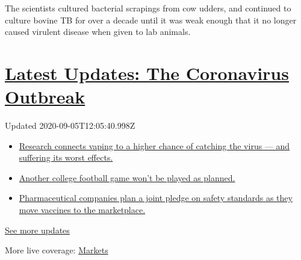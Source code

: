 The scientists cultured bacterial scrapings from cow udders, and
continued to culture bovine TB for over a decade until it was weak
enough that it no longer caused virulent disease when given to lab
animals.

\hypertarget{latest-updates-the-coronavirus-outbreak}{%
\section{\texorpdfstring{\href{https://www.nytimes3xbfgragh.onion/2020/09/04/world/covid-19-coronavirus.html?action=click\&pgtype=Article\&state=default\&region=MAIN_CONTENT_1\&context=storylines_live_updates}{Latest
Updates: The Coronavirus
Outbreak}}{Latest Updates: The Coronavirus Outbreak}}\label{latest-updates-the-coronavirus-outbreak}}

Updated 2020-09-05T12:05:40.998Z

\begin{itemize}
\tightlist
\item
  \href{https://www.nytimes3xbfgragh.onion/2020/09/04/world/covid-19-coronavirus.html?action=click\&pgtype=Article\&state=default\&region=MAIN_CONTENT_1\&context=storylines_live_updates\#link-1654f6ad}{Research
  connects vaping to a higher chance of catching the virus --- and
  suffering its worst effects.}
\item
  \href{https://www.nytimes3xbfgragh.onion/2020/09/04/world/covid-19-coronavirus.html?action=click\&pgtype=Article\&state=default\&region=MAIN_CONTENT_1\&context=storylines_live_updates\#link-52e4198a}{Another
  college football game won't be played as planned.}
\item
  \href{https://www.nytimes3xbfgragh.onion/2020/09/04/world/covid-19-coronavirus.html?action=click\&pgtype=Article\&state=default\&region=MAIN_CONTENT_1\&context=storylines_live_updates\#link-181cef0}{Pharmaceutical
  companies plan a joint pledge on safety standards as they move
  vaccines to the marketplace.}
\end{itemize}

\href{https://www.nytimes3xbfgragh.onion/2020/09/04/world/covid-19-coronavirus.html?action=click\&pgtype=Article\&state=default\&region=MAIN_CONTENT_1\&context=storylines_live_updates}{See
more updates}

More live coverage:
\href{https://www.nytimes3xbfgragh.onion/live/2020/09/04/business/stock-market-today-coronavirus?action=click\&pgtype=Article\&state=default\&region=MAIN_CONTENT_1\&context=storylines_live_updates}{Markets}

